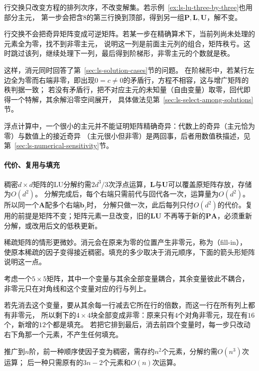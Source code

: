 行交换只改变方程的排列次序，不改变解集。若示例~\ref{ex:ls-lu-three-by-three}也用部分主元，
第一步会把含$8$的第三行换到顶部，得到另一组$\bm P,\bm L,\bm U$，解不变。

行交换不会把奇异矩阵变成可逆矩阵。若某一步在精确算术下，当前列尚未处理的元素全为零，找不到非零主元，
说明这一列是前面主元列的组合，矩阵秩亏。这时跳过该列，继续处理下一列，最后得到阶梯形，非零主元的个数就是秩。

这样，消元同时回答了第~\ref{sec:ls-solution-cases}节的问题。
在阶梯形中，若某行左边全为零而右端非零，即出现$0=c\neq0$的矛盾行，方程不相容，这与增广矩阵的秩判据一致；
若没有矛盾行，把不对应主元的未知量（自由变量）取零，回代即得一个特解，其余解沿零空间展开，
具体做法见第~\ref{sec:ls-select-among-solutions}节。

浮点计算中，一个很小的主元并不能证明矩阵精确奇异：代数上的奇异（主元恰为零）与数值上的接近奇异
（主元很小但非零）是两回事，后者用数值秩描述，见第~\ref{sec:ls-numerical-sensitivity}节。

\paragraph{代价、复用与填充}

稠密$d\times d$矩阵的LU分解约需$2d^3/3$次浮点运算，$\bm L$与$\bm U$可以覆盖原矩阵存放，存储为$O(d^2)$。
分解完成后，每个右端只需前代与回代各一次，运算量为$O(d^2)$。所以同一个$\bm A$配多个右端$\bm b_j$时，
分解只做一次，此后每列只付$O(d^2)$的代价。复用的前提是矩阵不变；矩阵元素一旦改变，旧的$\bm L\bm U$
不再等于新的$\bm P\bm A$，必须重新分解，或改用后文的低秩更新。

稀疏矩阵的情形更微妙。消元会在原来为零的位置产生非零元，称为（fill-in），
使原本稀疏的因子变得接近稠密。填充的多少取决于消元顺序，下面的箭头形矩阵说明这一点。

\begin{example}[箭头形矩阵的填充]
\label{ex:ls-arrow-fill-in}
考虑一个$5\times5$矩阵，其中一个变量与其余全部变量耦合，其余变量彼此不耦合，
非零元只在对角线和这个变量对应的行与列上。

若先消去这个变量，要从其余每一行减去它所在行的倍数，而这一行在所有列上都有非零元，
所以剩下的$4\times4$块全部变成非零：原来只有$4$个对角非零元，现在有$16$个，新增的$12$个都是填充。
若把它排到最后，消去前四个变量时，每一步只改动右下角那一个元素，不产生任何填充。

推广到$n$阶，前一种顺序使因子变为稠密，需存约$n^2$个元素，分解约需$O(n^3)$次运算；
后一种只需原有的$3n-2$个元素和$O(n)$次运算。
\end{example}

